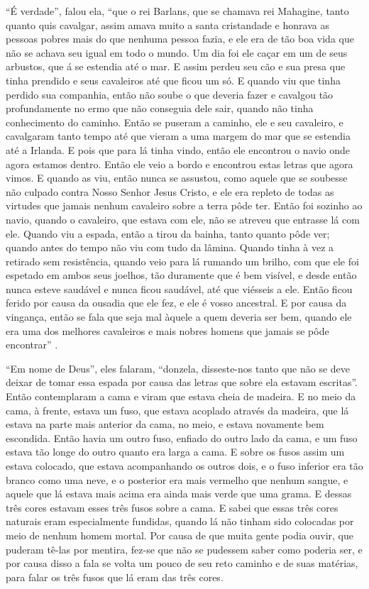 “É verdade”, falou ela, “que o rei Barlans, que se chamava rei Mahagine, tanto
quanto quis cavalgar, assim amava muito a santa cristandade e honrava as
pessoas pobres mais do que nenhuma pessoa fazia, e ele era de tão boa vida que
não se achava seu igual em todo o mundo. Um dia foi ele caçar em um de seus
arbustos, que á se estendia até o mar. E assim perdeu seu cão e sua presa que
tinha prendido e seus cavaleiros até que ficou um só. E quando viu que
tinha perdido sua companhia, então não soube o que deveria fazer e cavalgou tão
profundamente no ermo que não conseguia dele sair, quando não tinha
conhecimento do caminho. Então se puseram a caminho, ele e seu cavaleiro, e
cavalgaram tanto tempo até que vieram a uma margem do mar que se estendia até a
Irlanda. E pois que para lá tinha vindo, então ele encontrou o navio onde agora
estamos dentro. Então ele veio a bordo e encontrou estas letras que agora
vimos. E quando as viu, então nunca se assustou, como aquele que se soubesse
não culpado contra Nosso Senhor Jesus Cristo, e ele era repleto de todas as
virtudes que jamais nenhum cavaleiro sobre a terra pôde ter. Então foi
sozinho ao navio, quando o cavaleiro, que estava com ele, não se atreveu que
entrasse lá com ele. Quando viu a espada, então a tirou da bainha, tanto quanto
pôde ver; quando antes do tempo não viu com tudo da lâmina. Quando tinha à vez
a retirado sem resistência, quando veio para lá rumando um brilho, com que ele
foi espetado em ambos seus joelhos, tão duramente que é bem visível, e desde
então nunca esteve saudável e nunca ficou saudável, até que viésseis a ele.
Então ficou ferido por causa da ousadia que ele fez, e ele é vosso ancestral. E
por causa da vingança, então se fala que seja mal àquele a quem deveria ser
bem, quando ele era uma dos melhores cavaleiros e mais nobres homens que jamais
se pôde encontrar” . 

“Em nome de Deus”, eles falaram, “donzela, disseste-nos tanto que não se deve
deixar de tomar essa espada por causa das letras que sobre ela estavam
escritas”. Então contemplaram a cama e viram que estava cheia de madeira. E no
meio da cama, à frente, estava um fuso, que estava acoplado através da madeira,
que lá estava na parte mais anterior da cama, no meio, e estava novamente bem
escondida. Então havia um outro fuso, enfiado do outro lado da cama, e um fuso
estava tão longe do outro quanto era larga a cama. E sobre os fusos assim um
estava colocado, que estava acompanhando os outros dois, e o fuso inferior era
tão branco como uma neve, e o posterior era mais vermelho que nenhum sangue, e
aquele que lá estava mais acima era ainda mais verde que uma grama. E dessas
três cores estavam esses três fusos sobre a cama. E sabei que essas três cores
naturais eram especialmente fundidas, quando lá não tinham sido colocadas por
meio de nenhum homem mortal. Por causa de que muita gente podia ouvir, que
puderam tê-las por mentira, fez-se que não se pudessem saber como poderia ser,
e por causa disso a fala se volta um pouco de seu reto caminho e de suas
matérias, para falar os três fusos que lá eram das três cores. 

